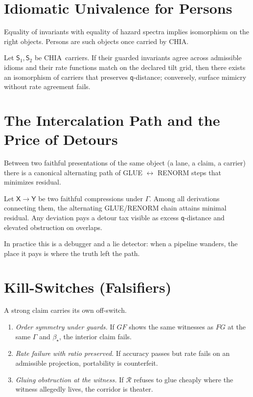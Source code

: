 \documentclass[11pt]{article}
\newcommand{\1}{\mathbf{1}}
\newcommand{\Guard}{\Gamma}
\newcommand{\Blur}{\beta}
\newcommand{\Fop}{F}
\newcommand{\Gop}{G}
\newcommand{\FG}{\Fop\Gop}
\newcommand{\GF}{\Gop\Fop}
\newcommand{\Qualon}{\mathsf{q}}        %
\newcommand{\CHIA}{\textsc{CHIA}}
\newcommand{\Cluster}{\mathsf{S}}
\newcommand{\Sheaf}{\mathscr{R}}
\begin{document}
\section{Idiomatic Univalence for Persons}
Equality of invariants with equality of hazard spectra implies isomorphism on the right objects. Persons are such objects once carried by \CHIA.

\begin{thm}[Idiomatic Univalence for \CHIA]\label{thm:univalence}
Let \(\Cluster_1,\Cluster_2\) be \CHIA\ carriers. If their guarded invariants agree across admissible idioms and their rate functions match on the declared tilt grid, then there exists an isomorphism of carriers that preserves \(\Qualon\)-distance; conversely, surface mimicry without rate agreement fails.
\end{thm}

\section{The Intercalation Path and the Price of Detours}\label{sec:intercalation}
Between two faithful presentations of the same object (a lane, a claim, a carrier) there is a canonical alternating path of GLUE \(\leftrightarrow\) RENORM steps that minimizes residual.

\begin{lem}[Intercalation]
Let \(\mathsf{X}\to\mathsf{Y}\) be two faithful compressions under \(\Guard\). Among all derivations connecting them, the alternating GLUE/RENORM chain attains minimal residual. Any deviation pays a detour tax visible as excess \(\Qualon\)-distance and elevated obstruction on overlaps.
\end{lem}

\noindent In practice this is a debugger and a lie detector: when a pipeline wanders, the place it pays is where the truth left the path.

\section{Kill-Switches (Falsifiers)}
A strong claim carries its own off-switch.
\begin{enumerate}[label=\textbf{KS\arabic*.}]
  \item \emph{Order symmetry under guards.} If \(\GF\) shows the same witnesses as \(\FG\) at the same \(\Guard\) and \(\Blur_\star\), the interior claim fails.
  \item \emph{Rate failure with ratio preserved.} If accuracy passes but rate fails on an admissible projection, portability is counterfeit.
  \item \emph{Gluing obstruction at the witness.} If \(\Sheaf\) refuses to glue cheaply where the witness allegedly lives, the corridor is theater.
\end{enumerate}
\end{document}
